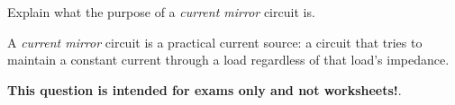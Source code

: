 

Explain what the purpose of a {\it current mirror} circuit is.







A {\it current mirror} circuit is a practical current source: a circuit that tries to maintain a constant current through a load regardless of that load's impedance.







{\bf This question is intended for exams only and not worksheets!}.



